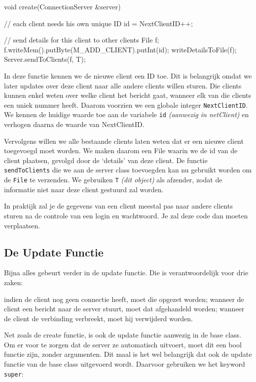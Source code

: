 \begin{code}
void create(ConnectionServer &server)
{     
	// each client needs his own unique ID
	id = NextClientID++;
	
	// send details for this client to other clients
	File f;
	f.writeMem().putByte(M_ADD_CLIENT).putInt(id);
	writeDetailsToFile(f);
	Server.sendToClients(f, T);
}
\end{code}

In deze functie kennen we de nieuwe client een ID toe. Dit is belangrijk omdat we later updates over deze client naar alle andere clients willen sturen. Die clients kunnen enkel weten over welke client het bericht gaat, wanneer elk van die clients een uniek nummer heeft. Daarom voorzien we een globale integer \texttt{NextClientID}. We kennen de huidige waarde toe aan de variabele \texttt{id} \textsl{(aanwezig in netClient)} en verhogen daarna de waarde van NextClientID.

Vervolgens willen we alle bestaande clients laten weten dat er een nieuwe client toegevoegd moet worden. We maken daarom een File waarin we de id van de client plaatsen, gevolgd door de `details' van deze client. De functie \texttt{sendToClients} die we aan de server class toevoegden kan nu gebruikt worden om de \texttt{File} te verzenden. We gebruiken \texttt{T} \textsl{(dit object)} als afzender, zodat de informatie niet naar deze client gestuurd zal worden.

\begin{note}
In praktijk zal je de gegevens van een client meestal pas naar andere clients sturen na de controle van een login en wachtwoord. Je zal deze code dan moeten verplaatsen.
\end{note}

\subsection{De Update Functie}

Bijna alles gebeurt verder in de update functie. Die is verantwoordelijk voor drie zaken:
\begin{itemize}
\tick indien de client nog geen connectie heeft, moet die opgezet worden;
\tick wanneer de client een bericht naar de server stuurt, moet dat afgehandeld worden;
\tick wanneer de client de verbinding verbreekt, moet hij verwijderd worden.
\end{itemize}

Net zoals de create functie, is ook de update functie aanwezig in de base class. Om er voor te zorgen dat de server ze automatisch uitvoert, moet dit een bool functie zijn, zonder argumenten. Dit maal is het wel belangrijk dat ook de update functie van de base class uitgevoerd wordt. Daarvoor gebruiken we het keyword \texttt{super}:

